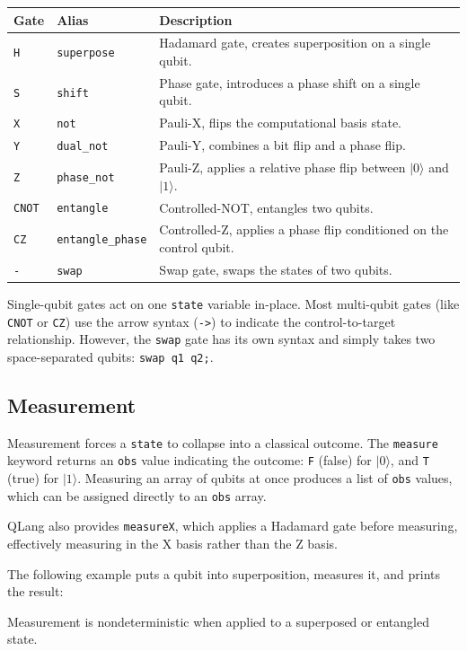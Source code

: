 \begin{center}
\begin{tabular}{|l|l|p{9cm}|}
\hline
\textbf{Gate} & \textbf{Alias} & \textbf{Description} \\
\hline
\texttt{H}    & \texttt{superpose}       & Hadamard gate, creates superposition on a single qubit. \\
\texttt{S}    & \texttt{shift}           & Phase gate, introduces a phase shift on a single qubit. \\
\texttt{X}    & \texttt{not}             & Pauli-X, flips the computational basis state. \\
\texttt{Y}    & \texttt{dual\_not}       & Pauli-Y, combines a bit flip and a phase flip. \\
\texttt{Z}    & \texttt{phase\_not}      & Pauli-Z, applies a relative phase flip between $|0\rangle$ and $|1\rangle$. \\
\texttt{CNOT} & \texttt{entangle}        & Controlled-NOT, entangles two qubits. \\
\texttt{CZ}   & \texttt{entangle\_phase} & Controlled-Z, applies a phase flip conditioned on the control qubit. \\
\texttt{-} & \texttt{swap}           & Swap gate, swaps the states of two qubits. \\
\hline
\end{tabular}
\end{center}

\newpage
Single-qubit gates act on one \texttt{state} variable in-place. Most multi-qubit gates (like \texttt{CNOT} or \texttt{CZ}) use the arrow syntax (\texttt{->}) to indicate the control-to-target relationship. However, the \texttt{swap} gate has its own syntax and simply takes two space-separated qubits: \texttt{swap q1 q2;}.



\subsection{Measurement}
\label{sec:measurement}

Measurement forces a \texttt{state} to collapse into a classical outcome.
The \texttt{measure} keyword returns an \texttt{obs} value indicating the outcome:
\texttt{F} (false) for $|0\rangle$, and \texttt{T} (true) for $|1\rangle$.
Measuring an array of qubits at once produces a list of \texttt{obs} values,
which can be assigned directly to an \texttt{obs} array.

QLang also provides \texttt{measureX}, which applies a Hadamard gate before
measuring, effectively measuring in the X basis rather than the Z basis.

The following example puts a qubit into superposition, measures it, and
prints the result:



Measurement is nondeterministic when applied to a superposed or entangled
state.

